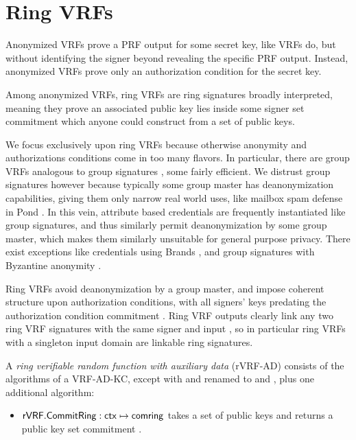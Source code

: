 
\section{Ring VRFs}
\label{sec:rvrf_def}

Anonymized VRFs prove a PRF output for some secret key, like VRFs do,
but without identifying the signer beyond revealing the specific PRF output.
Instead, anonymized VRFs prove only an authorization condition for
the secret key.

Among anonymized VRFs, ring VRFs are ring signatures broadly interpreted,
meaning they prove an associated public key lies inside some signer set
commitment \comring which anyone could construct from a set of public keys.

We focus exclusively upon ring VRFs because otherwise anonymity and
authorizations conditions come in too many flavors.
In particular, there are group VRFs analogous to group signatures
 \cite{group_sig_survey}, some fairly efficient.
%
We distrust group signatures however because typically some group master
has deanonymization capabilities, giving them only narrow real world uses,
like mailbox spam defense in Pond \cite{pond}.
%
In this vein, attribute based credentials are frequently instantiated
like group signatures, and thus similarly permit deanonymization by some
group master, which makes them similarly unsuitable for general purpose
privacy.
%
There exist exceptions like credentials using Brands \cite{brands06}, and
group signatures with Byzantine anonymity \cite{cryptoeprint:2021:181}.

Ring VRFs avoid deanonymization by a group master, and impose coherent
structure upon authorization conditions, with all signers' keys
predating the authorization condition commitment \comring. 
%
Ring VRF outputs clearly link any two ring VRF signatures with
the same signer and input \msg, so in particular
 ring VRFs with a singleton input domain are linkable ring signatures.

\smallskip

A {\em ring verifiable random function with auxiliary data} (rVRF-AD)
consists of the algorithms of a VRF-AD-KC, except with
 \compk and \openpk renamed to \comring and \openring,
 plus one additional algorithm:
\begin{itemize}
\item ${\mathsf{rVRF}}.{\mathsf{CommitRing}} : \mathsf{ctx} \mapsto \mathsf{comring}$ takes a set \ctx of
 public keys and returns a public key set commitment \comring.
\end{itemize}

